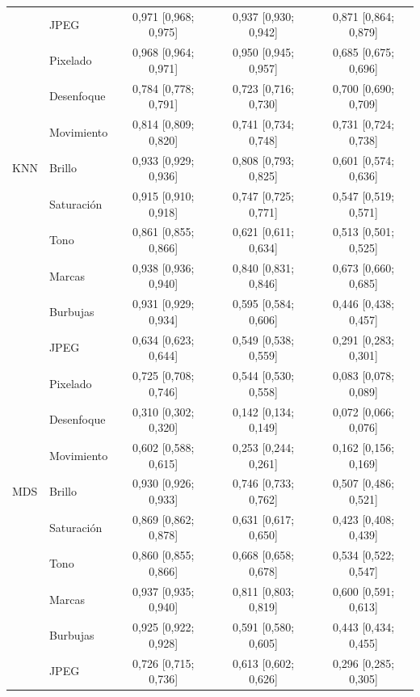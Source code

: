 {\begin{longtable}{llccc}
 & JPEG & 0{,}971 [0{,}968; 0{,}975] & 0{,}937 [0{,}930; 0{,}942] & 0{,}871 [0{,}864; 0{,}879] \\
 & Pixelado & 0{,}968 [0{,}964; 0{,}971] & 0{,}950 [0{,}945; 0{,}957] & 0{,}685 [0{,}675; 0{,}696] \\
 & Desenfoque & 0{,}784 [0{,}778; 0{,}791] & 0{,}723 [0{,}716; 0{,}730] & 0{,}700 [0{,}690; 0{,}709] \\
 & Movimiento & 0{,}814 [0{,}809; 0{,}820] & 0{,}741 [0{,}734; 0{,}748] & 0{,}731 [0{,}724; 0{,}738] \\
\midrule
KNN & Brillo & 0{,}933 [0{,}929; 0{,}936] & 0{,}808 [0{,}793; 0{,}825] & 0{,}601 [0{,}574; 0{,}636] \\
 & Saturación & 0{,}915 [0{,}910; 0{,}918] & 0{,}747 [0{,}725; 0{,}771] & 0{,}547 [0{,}519; 0{,}571] \\
 & Tono & 0{,}861 [0{,}855; 0{,}866] & 0{,}621 [0{,}611; 0{,}634] & 0{,}513 [0{,}501; 0{,}525] \\
 & Marcas & 0{,}938 [0{,}936; 0{,}940] & 0{,}840 [0{,}831; 0{,}846] & 0{,}673 [0{,}660; 0{,}685] \\
 & Burbujas & 0{,}931 [0{,}929; 0{,}934] & 0{,}595 [0{,}584; 0{,}606] & 0{,}446 [0{,}438; 0{,}457] \\
 & JPEG & 0{,}634 [0{,}623; 0{,}644] & 0{,}549 [0{,}538; 0{,}559] & 0{,}291 [0{,}283; 0{,}301] \\
 & Pixelado & 0{,}725 [0{,}708; 0{,}746] & 0{,}544 [0{,}530; 0{,}558] & 0{,}083 [0{,}078; 0{,}089] \\
 & Desenfoque & 0{,}310 [0{,}302; 0{,}320] & 0{,}142 [0{,}134; 0{,}149] & 0{,}072 [0{,}066; 0{,}076] \\
 & Movimiento & 0{,}602 [0{,}588; 0{,}615] & 0{,}253 [0{,}244; 0{,}261] & 0{,}162 [0{,}156; 0{,}169] \\
\midrule
MDS & Brillo & 0{,}930 [0{,}926; 0{,}933] & 0{,}746 [0{,}733; 0{,}762] & 0{,}507 [0{,}486; 0{,}521] \\
 & Saturación & 0{,}869 [0{,}862; 0{,}878] & 0{,}631 [0{,}617; 0{,}650] & 0{,}423 [0{,}408; 0{,}439] \\
 & Tono & 0{,}860 [0{,}855; 0{,}866] & 0{,}668 [0{,}658; 0{,}678] & 0{,}534 [0{,}522; 0{,}547] \\
 & Marcas & 0{,}937 [0{,}935; 0{,}940] & 0{,}811 [0{,}803; 0{,}819] & 0{,}600 [0{,}591; 0{,}613] \\
 & Burbujas & 0{,}925 [0{,}922; 0{,}928] & 0{,}591 [0{,}580; 0{,}605] & 0{,}443 [0{,}434; 0{,}455] \\
 & JPEG & 0{,}726 [0{,}715; 0{,}736] & 0{,}613 [0{,}602; 0{,}626] & 0{,}296 [0{,}285; 0{,}305] \\

\end{longtable}}
